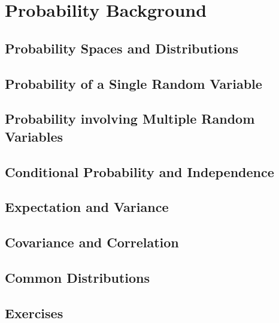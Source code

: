 
\chapter{Probability Background} \label{prob-theory}

\section{Probability Spaces and Distributions}

\section{Probability of a Single Random Variable}


\section{Probability involving Multiple Random Variables} 

\section{Conditional Probability and Independence}  

\section{Expectation and Variance}  

\section{Covariance and Correlation}

\section{Common Distributions}

\section{Exercises}